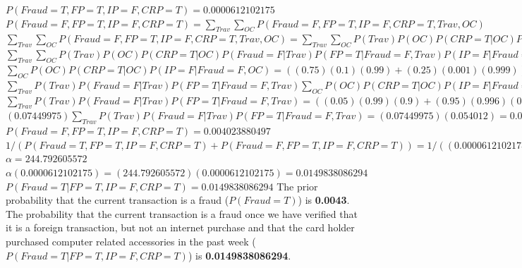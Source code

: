 \documentclass{article}
\begin{document}
$P(Fraud = T, FP = T, IP = F, CRP = T) = 0.0000612102175$
\newline
\newline
$P(Fraud = F, FP = T, IP = F, CRP = T) = \sum_{Trav} \sum_{OC} P(Fraud = F, FP = T, IP = F, CRP = T, Trav, OC)$
\newline
\newline
$\sum_{Trav} \sum_{OC} P(Fraud = F, FP = T, IP = F, CRP = T, Trav, OC) = \sum_{Trav} \sum_{OC} P(Trav)P(OC)P(CRP = T | OC)P(Fraud = F | Trav)P(FP = T | Fraud = F, Trav)P(IP = F | Fraud = F, OC)$
\newline
\newline
$\sum_{Trav} \sum_{OC} P(Trav)P(OC)P(CRP = T | OC)P(Fraud = F | Trav)P(FP = T | Fraud = F, Trav)P(IP = F | Fraud = F, OC) = \sum_{Trav} P(Trav)P(Fraud = F | Trav)P(FP = T | Fraud = F, Trav) \sum_{OC} P(OC)P(CRP = T | OC)P(IP = F | Fraud = F, OC)$
\newline
\newline
$\sum_{OC} P(OC)P(CRP = T | OC)P(IP = F | Fraud = F, OC) = ((0.75)(0.1)(0.99) + (0.25)(0.001)(0.999)) = 0.07449975$
\newline
\newline
$\sum_{Trav} P(Trav)P(Fraud = F | Trav)P(FP = T | Fraud = F, Trav) \sum_{OC} P(OC)P(CRP = T | OC)P(IP = F | Fraud = F, OC) = (0.07449975)\sum_{Trav} P(Trav)P(Fraud = F | Trav)P(FP = T | Fraud = F, Trav)$
\newline
\newline
$\sum_{Trav} P(Trav)P(Fraud = F | Trav)P(FP = T | Fraud = F, Trav) = ((0.05)(0.99)(0.9) + (0.95)(0.996)(0.01)) = 0.054012$
\newline
\newline
$(0.07449975)\sum_{Trav} P(Trav)P(Fraud = F | Trav)P(FP = T | Fraud = F, Trav) = (0.07449975)(0.054012) = 0.004023880497$
\newline
\newline
$P(Fraud = F, FP = T, IP = F, CRP = T) = 0.004023880497$
\newline
\newline
$1/(P(Fraud = T, FP = T, IP = F, CRP = T) + P(Fraud = F, FP = T, IP = F, CRP = T)) = 1/((0.0000612102175) + (0.004023880497)) = 244.792605572$
\newline
\newline
$\alpha = 244.792605572$
\newline
\newline
$\alpha (0.0000612102175) = (244.792605572)(0.0000612102175) = 0.0149838086294$
\newline
\newline
$P(Fraud = T | FP = T, IP = F, CRP = T) = 0.0149838086294$
\newline
\newline
The prior probability that the current transaction is a fraud ($P(Fraud = T)$) is \textbf{0.0043}.
\newline
The probability that the current transaction is a fraud once we have verified that it is a foreign transaction, but not an internet purchase and that the card holder purchased computer related accessories in the past week ($P(Fraud = T | FP = T, IP = F, CRP = T)$) is \textbf{0.0149838086294}. 
\end{document}
